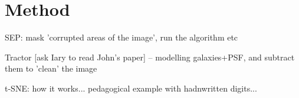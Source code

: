 \section{Method}

SEP: mask 'corrupted areas of the image', run the algorithm etc

Tractor [ask Iary to read John's paper] -- modelling galaxies+PSF, 
and subtract them to 'clean' the image

t-SNE: how it works... pedagogical example with hadnwritten digits...
